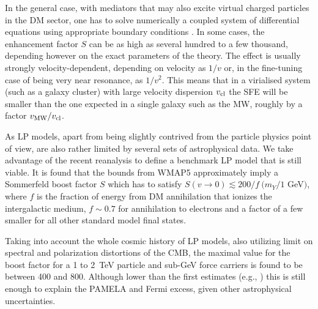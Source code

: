 \documentclass[10pt,aps,pra,reprint,amsmath,amsfonts,amssymb,showpacs,nofootinbib,floatfix]{revtex4-1}
\begin{document}
In the general case, with mediators that may also excite virtual
charged particles in the DM sector, one has to solve numerically a
coupled system of differential equations using appropriate boundary
conditions
\cite{2005PhRvD..71f3528H,2007NuPhB.787..152C,2009PhRvD..79a5014A}. In
some cases, the enhancement factor $S$ can be as high as several
hundred to a few thousand, depending however on the exact parameters
of the theory. The effect is usually strongly velocity-dependent,
depending on velocity as $1/v$ or, in the fine-tuning case of being
very near resonance, as $1/v^2$. This means that in a virialised
system (such as a galaxy cluster) with large velocity dispersion
$v_{\rm cl}$ the SFE will be smaller than the one expected in a single
galaxy such as the MW, roughly by a factor $v_{\rm MW}/v_{\rm
  cl}$.


As LP models, apart from being slightly contrived from the
particle physics point of view, are also rather limited by several
sets of astrophysical data. We take advantage of the recent reanalysis
\cite{Finkbeiner:2010sm} to define a benchmark LP model that
is still viable.  It is found that the bounds from WMAP5 approximately
imply a Sommerfeld boost factor $S$ which has to satisfy $S(v\to
0)\lesssim 200/f\ (m_Y/1$ GeV$)$, where $f$ is the fraction of energy
from DM annihilation that ionizes the intergalactic medium,
$f\sim 0.7$ for annihilation to electrons and a factor of a few smaller
for all other standard model final states.

Taking into account the whole cosmic history of LP models, also
utilizing limit on spectral and polarization distortions of the CMB,
the maximal value for the boost factor for a 1 to 2~TeV particle and
sub-GeV force carriers is found to be \cite{Finkbeiner:2010sm} between
400 and 800. Although lower than the first estimates (e.g.,
\cite{Bergstrom:2009fa,Meade:2009iu}) this is still enough to explain
the PAMELA and Fermi excess, given other astrophysical uncertainties.
\end{document}
